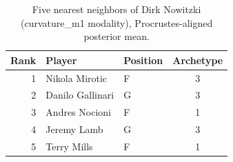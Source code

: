 \begin{table}[htbp]
  \centering\small
  \begin{tabular}{rllc}
    \toprule
    Rank & Player & Position & Archetype \\
    \midrule
    1 & Nikola Mirotic & F & 3 \\
    2 & Danilo Gallinari & G & 3 \\
    3 & Andres Nocioni & F & 1 \\
    4 & Jeremy Lamb & G & 3 \\
    5 & Terry Mills & F & 1 \\
    \bottomrule
  \end{tabular}
  \caption{Five nearest neighbors of Dirk Nowitzki (curvature_m1 modality), Procrustes-aligned posterior mean.}
  \label{tab:Dirk_Nowitzki_neighbors_curvature_m1}
\end{table}

